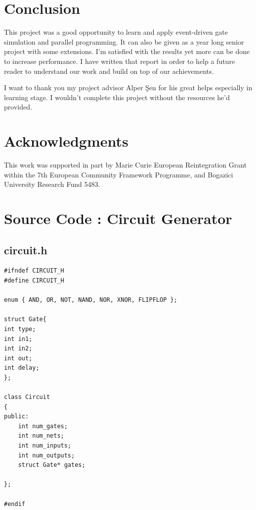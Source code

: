 \documentclass[a4paper,onesided,12pt]{report}
\begin{document}
\chapter{Conclusion}

This project was a good opportunity to learn and apply event-driven gate simulation and parallel programming. It can also be given as a year long senior project with some extensions. I'm satisfied with the results yet more can be done to increase performance. I have written that report in order to help a future reader to understand our work and build on top of our achievements.

I want to thank you my project advisor Alper Şen for his great helps especially in learning stage. I wouldn't complete this project without the resources  he'd provided.

\chapter*{Acknowledgments}

This work was supported in part by Marie Curie European Reintegration Grant within the 7th European Community Framework Programme, and Bogazici University Research Fund 5483.

\newpage

\appendix






\chapter{Source Code : Circuit Generator}
\section{circuit.h}
\tiny \begin{verbatim} 
#ifndef CIRCUIT_H
#define CIRCUIT_H

enum { AND, OR, NOT, NAND, NOR, XNOR, FLIPFLOP };

struct Gate{
int type;
int in1;
int in2;
int out;
int delay;
};

class Circuit
{
public:
	int num_gates;
	int num_nets;
	int num_inputs;
	int num_outputs;
	struct Gate* gates;

};

#endif
\end{verbatim}
\end{document}
